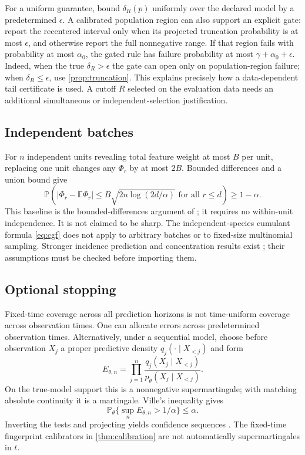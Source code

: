 \documentclass[11pt]{article}
\numberwithin{equation}{section}
\theoremstyle{definition}
\theoremstyle{remark}
\newcommand{\E}{\mathbb E}
\newcommand{\Pp}{\mathbb P}
\begin{document}
For a uniform guarantee, bound $\delta_R(p)$ uniformly over the declared model by a predetermined $\epsilon$. A calibrated population region can also support an explicit gate: report the recentered interval only when its projected truncation probability is at most $\epsilon$, and otherwise report the full nonnegative range. If that region fails with probability at most $\alpha_0$, the gated rule has failure probability at most $\gamma+\alpha_0+\epsilon$. Indeed, when the true $\delta_R>\epsilon$ the gate can open only on population-region failure; when $\delta_R\le\epsilon$, use \cref{prop:truncation}. This explains precisely how a data-dependent tail certificate is used. A cutoff $R$ selected on the evaluation data needs an additional simultaneous or independent-selection justification.

\subsection{Independent batches}
For $n$ independent units revealing total feature weight at most $B$ per unit, replacing one unit changes any $\Phi_r$ by at most $2B$. Bounded differences and a union bound give
\begin{equation}\label{eq:batchbound}
 \Pp\left( |\Phi_r-\E\Phi_r|\le
 B\sqrt{2n\log(2d/\alpha)}\text{ for all }r\le d\right)\ge1-\alpha.
\end{equation}
This baseline is the bounded-differences argument of \cite[Chapter 6]{Boucheron2013}; it requires no within-unit independence. It is not claimed to be sharp. The independent-species cumulant formula \eqref{eq:cgf} does not apply to arbitrary batches or to fixed-size multinomial sampling. Stronger incidence prediction and concentration results exist \cite{Eriksson2026}; their assumptions must be checked before importing them.

\subsection{Optional stopping}
Fixed-time coverage across all prediction horizons is not time-uniform coverage across observation times. One can allocate errors across predetermined observation times. Alternatively, under a sequential model, choose before observation $X_j$ a proper predictive density $q_j(\cdot\mid X_{<j})$ and form
\[
 E_{\theta,n}=\prod_{j=1}^n
 \frac{q_j(X_j\mid X_{<j})}{p_\theta(X_j\mid X_{<j})}.
\]
On the true-model support this is a nonnegative supermartingale; with matching absolute continuity it is a martingale. Ville's inequality gives
\[
 \Pp_\theta\{\sup_nE_{\theta,n}>1/\alpha\}\le\alpha.
\]
Inverting the tests and projecting yields confidence sequences \cite{Howard2021,Wasserman2020}. The fixed-time fingerprint calibrators in \cref{thm:calibration} are not automatically supermartingales in $t$.
\end{document}
